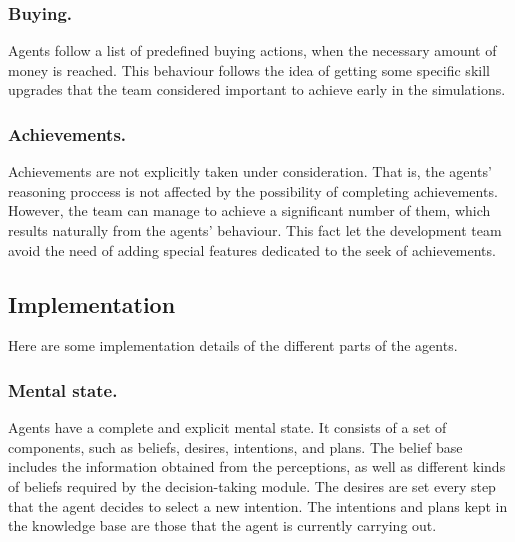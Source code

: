 \documentclass{llncs2e/llncs}
\begin{document}
\subsubsection{Buying.}

    Agents follow a list of predefined buying actions, when the necessary amount 
    of money is reached. This behaviour follows the idea of getting some specific skill 
    upgrades that the team considered important to achieve early in the simulations.
    

\subsubsection{Achievements.}

    Achievements are not explicitly taken under consideration. That is, the agents'
    reasoning proccess is not affected by the possibility of completing achievements.    
    However, the team can manage to achieve a significant number of them, which 
    results naturally from the agents' behaviour. 
    This fact let the development team avoid the need of adding special features 
    dedicated to the seek of achievements.
    
\subsection{Implementation}

    Here are some implementation details of the different parts of the agents.
    
\subsubsection{Mental state.}

    Agents have a complete and explicit mental state. It consists of a set of 
    components, such as beliefs, desires, intentions, and plans. 
    The belief base includes the information obtained from the perceptions, as
    well as different kinds of beliefs required by the decision-taking module.
    The desires are set every step that the agent decides to select a new intention.
    The intentions and plans kept in the knowledge base are those that the agent
    is currently carrying out.
    
\end{document}
